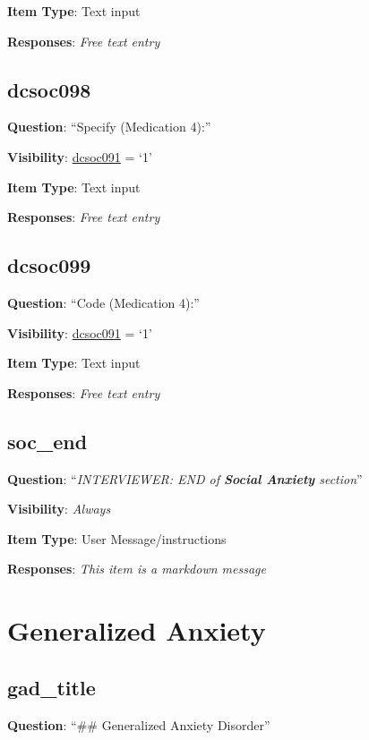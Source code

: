 \documentclass[]{book}
\begin{document}
\textbf{Item Type}: Text input

\textbf{Responses}: \emph{Free text entry}

\hypertarget{dcsoc098}{%
\section{dcsoc098}\label{dcsoc098}}

\textbf{Question}: ``Specify (Medication 4):''

\textbf{Visibility}: \protect\hyperlink{dcsoc091}{dcsoc091} = `1'

\textbf{Item Type}: Text input

\textbf{Responses}: \emph{Free text entry}

\hypertarget{dcsoc099}{%
\section{dcsoc099}\label{dcsoc099}}

\textbf{Question}: ``Code (Medication 4):''

\textbf{Visibility}: \protect\hyperlink{dcsoc091}{dcsoc091} = `1'

\textbf{Item Type}: Text input

\textbf{Responses}: \emph{Free text entry}

\hypertarget{soc_end}{%
\section{soc\_end}\label{soc_end}}

\textbf{Question}: ``\emph{INTERVIEWER: END of \textbf{Social Anxiety} section}''

\textbf{Visibility}: \emph{Always}

\textbf{Item Type}: User Message/instructions

\textbf{Responses}: \emph{This item is a markdown message}

\hypertarget{gad_section}{%
\chapter{Generalized Anxiety}\label{gad_section}}

\hypertarget{gad_title}{%
\section{gad\_title}\label{gad_title}}

\textbf{Question}: ``\#\# Generalized Anxiety Disorder''
\end{document}
